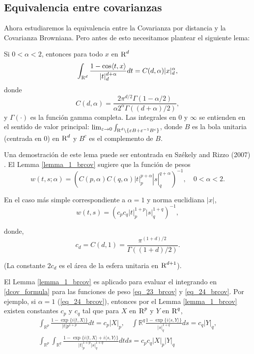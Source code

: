 	\subsection{Equivalencia entre covarianzas}
	
	Ahora estudiaremos la equivalencia entre la Covarianza por distancia y la Covarianza Browniana. Pero antes de esto necesitamos plantear el siguiente lema:

	\begin{lem}\label{lemma_1_brcov}
		Si $0<\alpha<2$, entonces para todo $x$ en $\textsc{R}^d$
		$$
		\int_{\textsc{R}^d} \frac{1-\cos \langle t, x\rangle}{|t|_d^{d+\alpha}} d t=C(d, \alpha)|x|_d^\alpha,
		$$
		donde
		$$
		C(d, \alpha)=\frac{2 \pi^{d / 2} \Gamma(1-\alpha / 2)}{\alpha 2^\alpha \Gamma((d+\alpha) / 2)},
		$$
		y $\Gamma(\cdot)$ es la funci\'on gamma completa. Las integrales en 0 y $\infty$ se entienden en el sentido de valor principal: $\lim_{\varepsilon \rightarrow 0} \int_{\textsc{R}^d \backslash\left\{\varepsilon B+\varepsilon^{-1} B^c\right\}}$, donde $B$ es la bola unitaria (centrada en 0) en $\textsc{R}^d$ y $B^c$ es el complemento de $B$.
	\end{lem}
	Una demostraci\'on de este lema puede ser entontrada en Székely and Rizzo (2007) \cite{Szekely2007}. El Lemma \ref{lemma_1_brcov}
	sugiere que la funci\'on de pesos
	\begin{equation}\label{eq_23_brcov}
	w(t, s ; \alpha)=\left(\left.\left.C(p, \alpha) C(q, \alpha)|t|_p^{p+\alpha}\right|s\right|_q ^{q+\alpha}\right)^{-1}, \quad 0<\alpha<2 .	
	\end{equation}

	En el caso m\'as simple correspondiente a $\alpha=1$ y norma euclidiana $|x|$,
	\begin{equation}\label{eq_24_brcov}
		w(t, s)=\left(c_p c_q|t|_p^{1+p}|s|_q^{1+q}\right)^{-1},
		\end{equation}
	
	donde,
	\begin{equation}\label{eq_25_brcov}
		c_d=C(d, 1)=\frac{\pi^{(1+d) / 2}}{\Gamma((1+d) / 2)} .
	\end{equation}
	
	(La constante $2 c_d$ es el \'area de la esfera unitaria en $\textsc{R}^{d+1}$).
	\begin{rem}
		El Lemma \ref{lemma_1_brcov} es aplicado para evaluar el integrando en \ref{dcov_formula} para las funciones de peso \ref{eq_23_brcov} y \ref{eq_24_brcov}. Por ejemplo, si $\alpha=1$ (\ref{eq_24_brcov}), entonces por el Lemma \ref{lemma_1_brcov} existen constantes $c_p$ y $c_q$ tal que para $X$ en $\textsc{R}^p$ y $Y$ en $\textsc{R}^q$,
		$$
		\begin{gathered}
		\int_{\mathbb{R}^p} \frac{1-\exp \{i\langle t, X\rangle\}}{|t|p^{1+p}} d t=c_p|X|_p, \quad \int{\mathbb{R}^q} \frac{1-\exp \{i\langle s, Y\rangle\}}{|s|_q^{1+q}} d s=c_q|Y|_q, \\
		\int_{\mathbb{R}^p} \int_{\mathbb{R}^q} \frac{1-\exp \{i\langle t, X\rangle+i\langle s, Y\rangle\}}{|t|_p^{1+p}|s|_q^{1+q}} d t d s=c_p c_q|X|_p|Y|_q
		\end{gathered}
		$$
	\end{rem}
	
